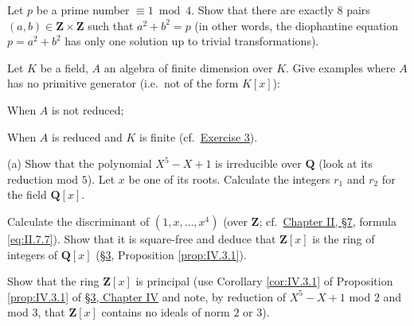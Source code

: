  Let $p$ be a prime number $\equiv1\bmod4$. Show that there are
exactly $8$ pairs $(a,b)\in\mathbf{Z}\times\mathbf{Z}$ such that
$a^{2}+b^{2}=p$ (in other words, the diophantine equation $p=a^{2}+b^{2}$
has only one solution up to trivial transformations).

 Let $K$ be a field, $A$ an algebra of finite dimension over $K$.
Give examples where $A$ has no primitive generator (i.e.\ not of the form
$K[x]$):
\begin{alist}
\item When $A$ is not reduced;
\item When $A$ is reduced and $K$ is finite (cf.\ \hyperref[exer:V.3]{Exercise 3}).
\end{alist}

 (a) Show that the polynomial $X^{5}-X+1$ is irreducible over
$\mathbf{Q}$ (look at its reduction mod $5$). Let $x$ be one of its roots.
Calculate the integers $r_{1}$ and $r_{2}$ for the field $\mathbf{Q}[x]$.
\begin{alist}
\item Calculate the discriminant of $(1,x,\ldots,x^{4})$ (over
$\mathbf{Z}$; cf.\ \hyperref[sec:2.7]{Chapter II, §7}, formula \eqref{eq:II.7.7}). Show that it
is square-free and deduce that $\mathbf{Z}[x]$ is the ring of integers of
$\mathbf{Q}[x]$ (\hyperref[sec:5.3]{§3}, Proposition \ref{prop:IV.3.1}).
\item Show that the ring $\mathbf{Z}[x]$ is principal (use Corollary
\ref{cor:IV.3.1} of Proposition \ref{prop:IV.3.1} of \hyperref[sec:4.3]{§3, Chapter IV} and note,
by reduction of $X^{5}-X+1$ mod $2$ and mod $3$, that $\mathbf{Z}[x]$
contains no ideals of norm $2$ or $3$).
\end{alist}

